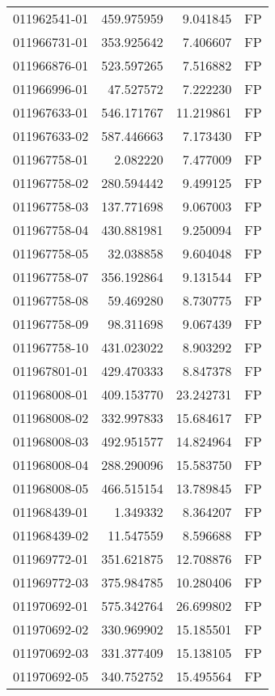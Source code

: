 \begin{tabular}{lrrl}
011962541-01 &  459.975959 &     9.041845 &   FP \\
011966731-01 &  353.925642 &     7.406607 &   FP \\
011966876-01 &  523.597265 &     7.516882 &   FP \\
011966996-01 &   47.527572 &     7.222230 &   FP \\
011967633-01 &  546.171767 &    11.219861 &   FP \\
011967633-02 &  587.446663 &     7.173430 &   FP \\
011967758-01 &    2.082220 &     7.477009 &   FP \\
011967758-02 &  280.594442 &     9.499125 &   FP \\
011967758-03 &  137.771698 &     9.067003 &   FP \\
011967758-04 &  430.881981 &     9.250094 &   FP \\
011967758-05 &   32.038858 &     9.604048 &   FP \\
011967758-07 &  356.192864 &     9.131544 &   FP \\
011967758-08 &   59.469280 &     8.730775 &   FP \\
011967758-09 &   98.311698 &     9.067439 &   FP \\
011967758-10 &  431.023022 &     8.903292 &   FP \\
011967801-01 &  429.470333 &     8.847378 &   FP \\
011968008-01 &  409.153770 &    23.242731 &   FP \\
011968008-02 &  332.997833 &    15.684617 &   FP \\
011968008-03 &  492.951577 &    14.824964 &   FP \\
011968008-04 &  288.290096 &    15.583750 &   FP \\
011968008-05 &  466.515154 &    13.789845 &   FP \\
011968439-01 &    1.349332 &     8.364207 &   FP \\
011968439-02 &   11.547559 &     8.596688 &   FP \\
011969772-01 &  351.621875 &    12.708876 &   FP \\
011969772-03 &  375.984785 &    10.280406 &   FP \\
011970692-01 &  575.342764 &    26.699802 &   FP \\
011970692-02 &  330.969902 &    15.185501 &   FP \\
011970692-03 &  331.377409 &    15.138105 &   FP \\
011970692-05 &  340.752752 &    15.495564 &   FP \\

\end{tabular}
